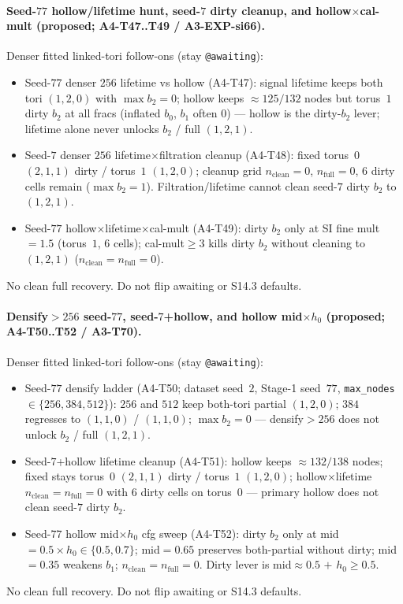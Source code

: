 \documentclass[11pt]{article}
\begin{document}
\paragraph{Seed-$77$ hollow/lifetime hunt, seed-$7$ dirty cleanup, and
hollow$\times$cal-mult (proposed; A4-T47..T49 / A3-EXP-si66).}
Denser fitted linked-tori follow-ons (stay \texttt{@awaiting}):
\begin{itemize}[leftmargin=1.5em]
  \item Seed-$77$ denser $256$ lifetime vs hollow (A4-T47): signal
  lifetime keeps both tori $(1,2,0)$ with $\max b_2{=}0$; hollow keeps
  $\approx 125/132$ nodes but torus~$1$ dirty $b_2$ at all fracs
  (inflated $b_0$, $b_1$ often $0$) --- hollow is the dirty-$b_2$ lever;
  lifetime alone never unlocks $b_2$ / full $(1,2,1)$.
  \item Seed-$7$ denser $256$ lifetime$\times$filtration cleanup
  (A4-T48): fixed torus~$0$ $(2,1,1)$ dirty / torus~$1$ $(1,2,0)$;
  cleanup grid $n_{\mathrm{clean}}{=}0$, $n_{\mathrm{full}}{=}0$,
  $6$ dirty cells remain ($\max b_2{=}1$). Filtration/lifetime cannot
  clean seed-$7$ dirty $b_2$ to $(1,2,1)$.
  \item Seed-$77$ hollow$\times$lifetime$\times$cal-mult (A4-T49):
  dirty $b_2$ only at SI fine mult${=}1.5$ (torus~$1$, $6$ cells);
  cal-mult$\ge 3$ kills dirty $b_2$ without cleaning to $(1,2,1)$
  ($n_{\mathrm{clean}}{=}n_{\mathrm{full}}{=}0$).
\end{itemize}
No clean full recovery. Do not flip awaiting or S14.3 defaults.

\paragraph{Densify${>}256$ seed-$77$, seed-$7$+hollow, and hollow mid$\times h_0$
(proposed; A4-T50..T52 / A3-T70).}
Denser fitted linked-tori follow-ons (stay \texttt{@awaiting}):
\begin{itemize}[leftmargin=1.5em]
  \item Seed-$77$ densify ladder (A4-T50; dataset seed~$2$, Stage-1
  seed~$77$, \texttt{max\_nodes}$\in\{256,384,512\}$): $256$ and $512$
  keep both-tori partial $(1,2,0)$; $384$ regresses to $(1,1,0)$ /
  $(1,1,0)$; $\max b_2{=}0$ --- densify${>}256$ does not unlock $b_2$ /
  full $(1,2,1)$.
  \item Seed-$7$+hollow lifetime cleanup (A4-T51): hollow keeps
  $\approx 132/138$ nodes; fixed stays torus~$0$ $(2,1,1)$ dirty /
  torus~$1$ $(1,2,0)$; hollow$\times$lifetime
  $n_{\mathrm{clean}}{=}n_{\mathrm{full}}{=}0$ with $6$ dirty cells on
  torus~$0$ --- primary hollow does not clean seed-$7$ dirty $b_2$.
  \item Seed-$77$ hollow mid$\times h_0$ cfg sweep (A4-T52): dirty $b_2$
  only at mid${=}0.5\times h_0\in\{0.5,0.7\}$; mid${=}0.65$ preserves
  both-partial without dirty; mid${=}0.35$ weakens $b_1$;
  $n_{\mathrm{clean}}{=}n_{\mathrm{full}}{=}0$. Dirty lever is
  mid$\approx 0.5$ $+$ $h_0\ge 0.5$.
\end{itemize}
No clean full recovery. Do not flip awaiting or S14.3 defaults.
\end{document}

